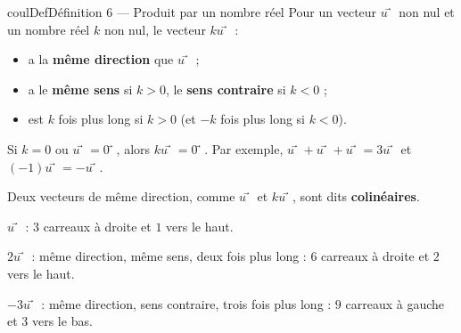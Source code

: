 \documentclass[11pt,a4paper]{article}
\makeatletter
\newcommand{\quadrillage}[4]{\draw[grille,step=1] (#1,#2) grid (#3,#4);}
\newcounter{lycee@signet}
\newcommand{\signet}[3][]{\stepcounter{lycee@signet}%
  \edef\lycee@dest{\if\relax\detokenize{#1}\relax
    signet.\arabic{lycee@signet}\else#1\fi}%
  \hypertarget{\lycee@dest}{}\bookmark[level=#2,dest=\lycee@dest]{#3}}
\def\vec#1{#1⃗}}%
\newenvironment{definitionbox}[1][Définition]%
  {\begin{boitecours}[phantom={\signet{2}{#1}}]{coulDef}{#1}}{\end{boitecours}}
\makeatother
\begin{document}
\begin{definitionbox}[Définition 6 --- Produit par un nombre réel]
Pour un vecteur $\vec{u}$ non nul et un nombre réel $k$ non nul, le vecteur $k\vec{u}$ :
\begin{itemize}
  \item a la \textbf{même direction} que $\vec{u}$ ;
  \item a le \textbf{même sens} si $k>0$, le \textbf{sens contraire} si $k<0$ ;
  \item est $k$ fois plus long si $k>0$ (et $-k$ fois plus long si $k<0$).
\end{itemize}
Si $k=0$ ou $\vec{u}=\vec{0}$, alors $k\vec{u}=\vec{0}$. Par exemple,
$\vec{u}+\vec{u}+\vec{u}=3\vec{u}$ et $(-1)\vec{u}=-\vec{u}$.

\smallskip
Deux vecteurs de même direction, comme $\vec{u}$ et $k\vec{u}$, sont dits
\textbf{colinéaires}.
\end{definitionbox}

\begin{exemplebox}[Exemple]
\begin{center}
\end{center}
$\vec{u}$ : $3$ carreaux à droite et $1$ vers le haut.

$2\vec{u}$ : même direction, même sens, deux fois plus long : $6$ carreaux à droite et $2$
vers le haut.

$-3\vec{u}$ : même direction, sens contraire, trois fois plus long : $9$ carreaux à gauche
et $3$ vers le bas.
\end{exemplebox}
\end{document}
